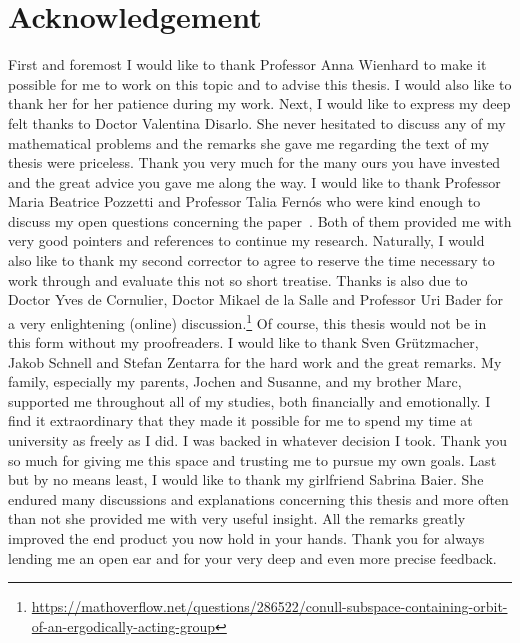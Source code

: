 \clearpage
{}
\markleft{}
\pagestyle{useheadings}
\section*{Acknowledgement}
%
\label{sec:acknowledgement}

First and foremost I would like to thank Professor Anna Wienhard to make it possible for me to work on this topic and to advise this thesis. I would also like to thank her for her patience during my work. Next, I would like to express my deep felt thanks to Doctor Valentina Disarlo. She never hesitated to discuss any of my mathematical problems and the remarks she gave me regarding the text of my thesis were priceless. Thank you very much for the many ours you have invested and the great advice you gave me along the way.
I would like to thank Professor Maria Beatrice Pozzetti and Professor Talia Fernós who were kind enough to discuss my open questions concerning the paper~\cite{MR3509968}. Both of them provided me with very good pointers and references to continue my research. Naturally, I would also like to thank my second corrector to agree to reserve the time necessary to work through and evaluate this not so short treatise.
Thanks is also due to Doctor Yves de Cornulier, Doctor Mikael de la Salle and Professor Uri Bader for a very enlightening (online) discussion.\footnote{\url{https://mathoverflow.net/questions/286522/conull-subspace-containing-orbit-of-an-ergodically-acting-group}} 
Of course, this thesis would not be in this form without my proofreaders. I would like to thank Sven Grützmacher, Jakob Schnell and Stefan Zentarra for the hard work and the great remarks.
My family, especially my parents, Jochen and Susanne, and my brother Marc, supported me throughout all of my studies, both financially and emotionally. I find it extraordinary that they made it possible for me to spend my time at university as freely as I did. I was backed in whatever decision I took. Thank you so much for giving me this space and trusting me to pursue my own goals.
Last but by no means least, I would like to thank my girlfriend Sabrina Baier. She endured many discussions and explanations concerning this thesis and more often than not she provided me with very useful insight. All the remarks greatly improved the end product you now hold in your hands. Thank you for always lending me an open ear and for your very deep and even more precise feedback.

\clearpage
\pagestyle{useheadings}

